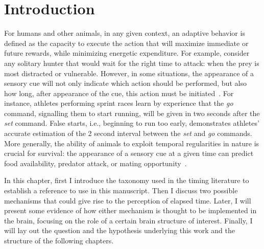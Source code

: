 \chapter{Introduction}
\label{ch:intro:intro}

For humans and other animals, in any given context, an adaptive behavior is defined as the capacity to execute the action that will maximize immediate or future rewards, while minimizing energetic expenditure.
For example, consider any solitary hunter that would wait for the right time to attack: 
    when the prey is most distracted or vulnerable.
However, in some situations, the appearance of a sensory cue will not only indicate which action should be performed, but also how long, after appearance of the cue, this action must be initiated~\cite{Balsam2009Map, Nobre2018NatRevNeurosci}.
For instance, athletes performing sprint races learn by experience that the \textit{go} command, signalling them to start running, will be given in two seconds after the \textit{set} command.
False starts, i.e., beginning to run too early, demonstrates athletes' accurate estimation of the 2 second interval between the \textit{set} and \textit{go} commands.
More generally, the ability of animals to exploit temporal regularities in nature is crucial for survival:
    the appearance of a sensory cue at a given time can predict food availability, predator attack, or mating opportunity~\cite{Kacelnik2002,Gallistel1990book}.
\par
In this chapter, first I introduce the taxonomy used in the timing literature to establish a reference to use in this manuscript.
Then I discuss two possible mechanisms that could give rise to the perception of elapsed time.
Later, I will present some evidence of how either mechanism is thought to be implemented in the brain, focusing on the role of a certain brain structure of interest.
Finally, I will lay out the question and the hypothesis underlying this work and the structure of the following chapters.






